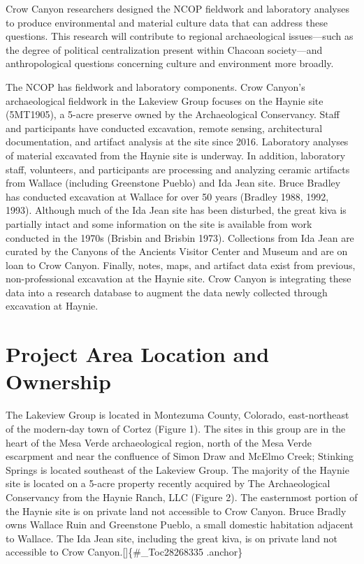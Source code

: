 \documentclass[
  12pt,
]{krantz}
\begin{document}
Crow Canyon researchers designed the NCOP fieldwork and laboratory
analyses to produce environmental and material culture data that can
address these questions. This research will contribute to regional
archaeological issues---such as the degree of political centralization
present within Chacoan society---and anthropological questions
concerning culture and environment more broadly.

The NCOP has fieldwork and laboratory components. Crow Canyon's
archaeological fieldwork in the Lakeview Group focuses on the Haynie
site (5MT1905), a 5-acre preserve owned by the Archaeological
Conservancy. Staff and participants have conducted excavation, remote
sensing, architectural documentation, and artifact analysis at the site
since 2016. Laboratory analyses of material excavated from the Haynie
site is underway. In addition, laboratory staff, volunteers, and
participants are processing and analyzing ceramic artifacts from Wallace
(including Greenstone Pueblo) and Ida Jean site. Bruce Bradley has
conducted excavation at Wallace for over 50 years (Bradley 1988, 1992,
1993). Although much of the Ida Jean site has been disturbed, the great
kiva is partially intact and some information on the site is available
from work conducted in the 1970s (Brisbin and Brisbin 1973). Collections
from Ida Jean are curated by the Canyons of the Ancients Visitor Center
and Museum and are on loan to Crow Canyon. Finally, notes, maps, and
artifact data exist from previous, non-professional excavation at the
Haynie site. Crow Canyon is integrating these data into a research
database to augment the data newly collected through excavation at
Haynie.

\hypertarget{project-area-location-and-ownership}{%
\section{Project Area Location and Ownership}\label{project-area-location-and-ownership}}

The Lakeview Group is located in Montezuma County, Colorado,
east-northeast of the modern-day town of Cortez (Figure 1). The sites in
this group are in the heart of the Mesa Verde archaeological region,
north of the Mesa Verde escarpment and near the confluence of Simon Draw
and McElmo Creek; Stinking Springs is located southeast of the Lakeview
Group. The majority of the Haynie site is located on a 5-acre property
recently acquired by The Archaeological Conservancy from the Haynie
Ranch, LLC (Figure 2). The easternmost portion of the Haynie site is on
private land not accessible to Crow Canyon. Bruce Bradly owns Wallace
Ruin and Greenstone Pueblo, a small domestic habitation adjacent to
Wallace. The Ida Jean site, including the great kiva, is on private land
not accessible to Crow Canyon.{[}{]}\{\#\_Toc28268335 .anchor\}
\end{document}
